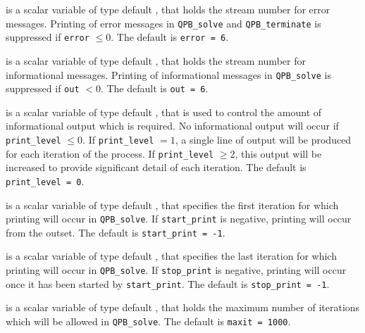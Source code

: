 \begin{description}

 is a scalar variable of type default \integer, that holds the
stream number for error messages. Printing of error messages in
{\tt QPB\_solve} and {\tt QPB\_terminate}
is suppressed if {\tt error} $\leq 0$.
The default is {\tt error = 6}.

 is a scalar variable of type default \integer, that holds the
stream number for informational messages. Printing of informational messages in
{\tt QPB\_solve} is suppressed if {\tt out} $< 0$.
The default is {\tt out = 6}.

 is a scalar variable of type default \integer, that is used
to control the amount of informational output which is required. No
informational output will occur if {\tt print\_level} $\leq 0$. If
{\tt print\_level} $= 1$, a single line of output will be produced for each
iteration of the process. If {\tt print\_level} $\geq 2$, this output will be
increased to provide significant detail of each iteration.
The default is {\tt print\_level = 0}.

 is a scalar variable of type default \integer, that specifies
the first iteration for which printing will occur in {\tt QPB\_solve}.
If {\tt start\_print} is negative, printing will occur from the outset.
The default is {\tt start\_print = -1}.

 is a scalar variable of type default \integer, that specifies
the last iteration for which printing will occur in  {\tt QPB\_solve}.
If {\tt stop\_print} is negative, printing will occur once it has been
started by {\tt start\_print}.
The default is {\tt stop\_print = -1}.

 is a scalar variable of type default \integer, that holds the
maximum number of iterations which will be allowed in {\tt QPB\_solve}.
The default is {\tt maxit = 1000}.




\end{description}
